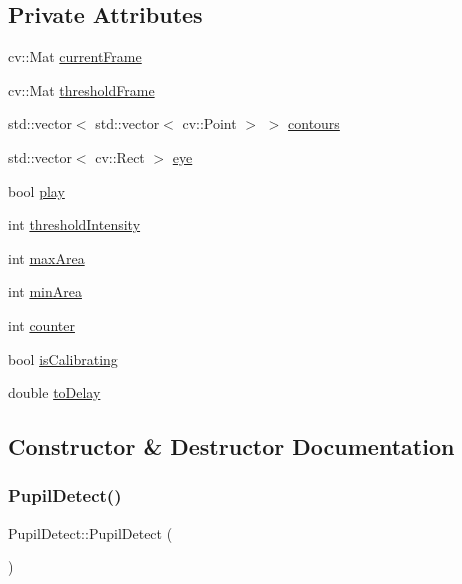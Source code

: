 \subsection*{Private Attributes}
\begin{DoxyCompactItemize}
\item 
cv\+::\+Mat \mbox{\hyperlink{class_pupil_detect_a2573a2415b451c876ab47a0ef016ec18}{current\+Frame}}
\item 
cv\+::\+Mat \mbox{\hyperlink{class_pupil_detect_ad2b693a118fb991ea45cb8fb83dd0f63}{threshold\+Frame}}
\item 
std\+::vector$<$ std\+::vector$<$ cv\+::\+Point $>$ $>$ \mbox{\hyperlink{class_pupil_detect_a28325d88d52b09e78d25f17b3d898aeb}{contours}}
\item 
std\+::vector$<$ cv\+::\+Rect $>$ \mbox{\hyperlink{class_pupil_detect_aee60f1bd292f20e41057139483c9d940}{eye}}
\item 
bool \mbox{\hyperlink{class_pupil_detect_af956995e72f4c348ae4056aba2112e2b}{play}}
\item 
int \mbox{\hyperlink{class_pupil_detect_a0a13ac6ad9894befc3da11ef02add74f}{threshold\+Intensity}}
\item 
int \mbox{\hyperlink{class_pupil_detect_a04fb7c5b3619d86b2f34ca90b56935e6}{max\+Area}}
\item 
int \mbox{\hyperlink{class_pupil_detect_ad1aa1a502f314a9dbdcfbb784cf14944}{min\+Area}}
\item 
int \mbox{\hyperlink{class_pupil_detect_a6fc0c70df2b083d7c24be0a4dff9d7a5}{counter}}
\item 
bool \mbox{\hyperlink{class_pupil_detect_ad4192b7bc071abfed746e463f383b866}{is\+Calibrating}}
\item 
double \mbox{\hyperlink{class_pupil_detect_a2649d7093083c33607bd412707773a51}{to\+Delay}}
\end{DoxyCompactItemize}


\subsection{Constructor \& Destructor Documentation}
\mbox{\label{class_pupil_detect_aa1ace17fac0af12bee24ca0413cc59a0}} 
\subsubsection{\texorpdfstring{Pupil\+Detect()}{PupilDetect()}}
{\footnotesize\ttfamily Pupil\+Detect\+::\+Pupil\+Detect (\begin{DoxyParamCaption}{ }\end{DoxyParamCaption})}

